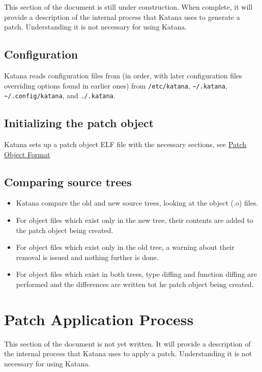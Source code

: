 \documentclass[11pt]{article}
\begin{document}
  This section of the document is still under construction. When
  complete, it will provide a description of the internal process that
  Katana uses to generate a patch. Understanding it is not necessary
  for using Katana.
  
\subsection{Configuration}
\label{sec-8.1}

   Katana reads configuration files from (in order, with later
   configuration files overriding options found in earlier ones) from
   \texttt{/etc/katana}, \texttt{\textasciitilde{}/.katana}, \texttt{\textasciitilde{}/.config/katana}, and \texttt{./.katana}.

\subsection{Initializing the patch object}
\label{sec-8.2}

   Katana sets up a patch object ELF file with the necessary sections,
   see \hyperref[sec-7]{Patch Object Format}
\subsection{Comparing source trees}
\label{sec-8.3}

\begin{itemize}
\item Katana compare the old and new source trees, looking at the object (.o)
     files.
\item For object files which exist only in the new tree, their contents
     are added to the patch object being created.
\item For object files which exist only in the old tree, a warning
     about their removal is issued and nothing further is done.
\item For object files which exist in both trees, type diffing and
     function diffing are performed and the differences are written
     tot he patch object being created.
\end{itemize}
\section{Patch Application Process}
\label{sec-9}

  This section of the document is not yet written. It will provide a
  description of the internal process that Katana uses to apply a
  patch. Understanding it is not necessary for using Katana.
\end{document}
